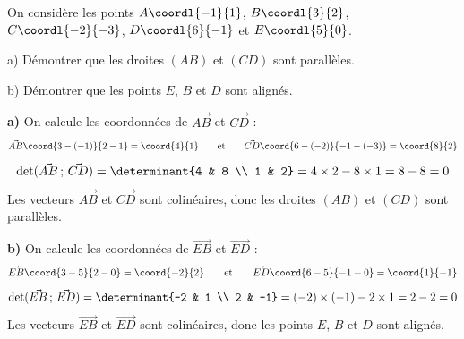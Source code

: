 \documentclass{poly}
\begin{document}
\begin{methode}
	On considère les points $A\coordl{-1}{1}$, $B\coordl{3}{2}$, $C\coordl{-2}{-3}$, $D\coordl{6}{-1}$ et $E\coordl{5}{0}$.

	a) Démontrer que les droites $(AB)$ et $(CD)$ sont parallèles.

	b) Démontrer que les points $E$, $B$ et $D$ sont alignés.

	\begin{correction}
		\textbf{a)} On calcule les coordonnées de $\vec{AB}$ et $\vec{CD}$ :
		\[
			\vec{AB}\coord{3-(-1)}{2-1} = \coord{4}{1}
			\qquad\text{et}\qquad
			\vec{CD}\coord{6-(-2)}{-1-(-3)} = \coord{8}{2}
		\]
		\[
			\det(\vec{AB}\,;\,\vec{CD}) = \determinant{4 & 8 \\ 1 & 2} = 4\times2 - 8\times1 = 8 - 8 = 0
		\]
		Les vecteurs $\vec{AB}$ et $\vec{CD}$ sont colinéaires, donc les droites $(AB)$ et $(CD)$ sont parallèles.

		\ms
		\textbf{b)} On calcule les coordonnées de $\vec{EB}$ et $\vec{ED}$ :
		\[
			\vec{EB}\coord{3-5}{2-0} = \coord{-2}{2}
			\qquad\text{et}\qquad
			\vec{ED}\coord{6-5}{-1-0} = \coord{1}{-1}
		\]
		\[
			\det(\vec{EB}\,;\,\vec{ED}) = \determinant{-2 & 1 \\ 2 & -1} = (-2)\times(-1) - 2\times1 = 2 - 2 = 0
		\]
		Les vecteurs $\vec{EB}$ et $\vec{ED}$ sont colinéaires, donc les points $E$, $B$ et $D$ sont alignés.
	\end{correction}
\end{methode}


% 
% 
% 
% 
% 
% 
% 
% 
% 
% 
% 
% 
% 
% 
% 
% 
\end{document}
